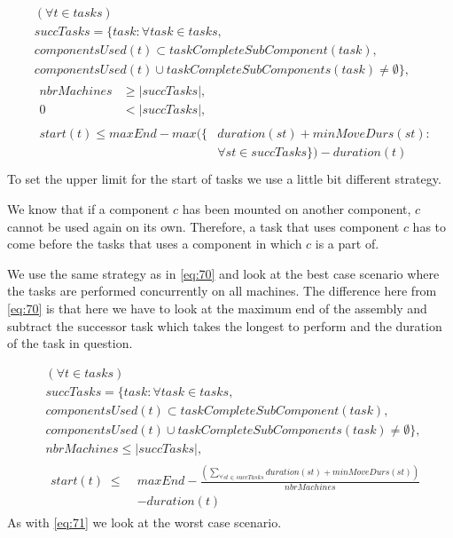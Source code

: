   \begin{equation}\label{eq:72}
  \begin{aligned}
  &(\forall t \in tasks) \\
  &succTasks = \{task : \forall task \in tasks,\\
  &componentsUsed(t) \subset taskCompleteSubComponent(task), \\
  &componentsUsed(t) \cup taskCompleteSubComponents(task) \neq \emptyset\}, \\
  &\begin{aligned}
  nbrMachines &\ge |succTasks|,\\
  0 &< |succTasks|,
  \end{aligned}\\
  &\begin{aligned}
  start(t) \le maxEnd - max(\{&duration(st) + minMoveDurs(st) :\\
  &\forall st \in succTasks\}) - duration(t)
  \end{aligned}\\
  \end{aligned}
  \end{equation}
  To set the upper limit for the start of tasks we use a little bit different strategy.
  
  We know that if a component $c$ has been mounted on another component, $c$ cannot be used again on its own. Therefore, a task that uses component $c$ has to come before the tasks that uses a component in which $c$ is a part of.
  
  We use the same strategy as in \ref{eq:70} and look at the best case scenario where the tasks are performed concurrently on all machines. The difference here from \ref{eq:70} is that here we have to look at the maximum end of the assembly and subtract the successor task which takes the longest to perform and the duration of the task in question.
  
  \begin{equation}\label{eq:73}
  \begin{aligned}
  &(\forall t \in tasks)\\
  &succTasks = \{task : \forall task \in tasks, \\
  &componentsUsed(t) \subset taskCompleteSubComponent(task), \\
  &componentsUsed(t) \cup taskCompleteSubComponents(task) \neq \emptyset\}, \\
  &nbrMachines \le |succTasks|, \\
  &\begin{aligned}
  start(t) \; \le \; &maxEnd - \frac{\left(\sum_{\forall st \in succTasks}duration(st) + minMoveDurs(st)\right)}{nbrMachines}\\
  &- duration(t)
  \end{aligned}
  \end{aligned}
  \end{equation}
  As with \ref{eq:71} we look at the worst case scenario.
  
